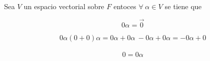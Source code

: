 		\begin{proposicion} Sea $V$ un espacio vectorial sobre $F$ entoces $\forall \ \alpha \in V$ se tiene que  
		
		\end{proposicion}
		 
		 \begin{equation}
		 0 \alpha = \overrightarrow{0} \nonumber
		 \end{equation}
		 
		 \begin{equation}
		 0 \alpha ( 0 + 0 ) \alpha = 0 \alpha + 0 \alpha \
		 - 0 \alpha + 0 \alpha = - 0 \alpha + 0 \nonumber
		 \end{equation}
			\\
		\begin{equation}
		0 = 0 \alpha \nonumber
		\end{equation}		
	\\	
		
	




